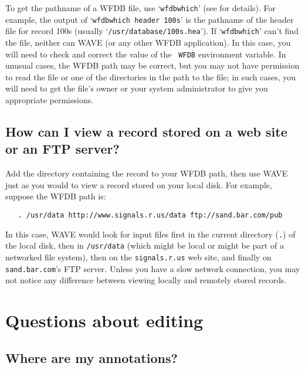\documentclass[twoside]{book}
\newcommand{\WAVE}{{\sf WAVE}\xspace}
\begin{document}
To get the pathname of a WFDB file, use `{\tt wfdbwhich}' (see
for details).  For example, the output of `{\tt wfdbwhich
header 100s}' is the pathname of the header file for record 100s
(usually `{\tt /usr/database/100s.hea}').  If `{\tt wfdbwhich}'
can't find the file, neither can \WAVE{} (or any other WFDB application).
In this case, you will need to check and correct the value of the {\tt
WFDB} environment variable.  In unusual cases, the WFDB path may be
correct, but you may not have permission to read the file or one of
the directories in the path to the file; in such cases, you will need
to get the file's owner or your system administrator to give you
appropriate permissions.

\subsection{How can I view a record stored on a web site or an FTP server?}

Add the directory containing the record to your WFDB path, then use \WAVE{}
just as you would to view a record stored on your local disk.  For example,
suppose the WFDB path is:
\begin{verbatim}
   . /usr/data http://www.signals.r.us/data ftp://sand.bar.com/pub
\end{verbatim}
In this case, \WAVE{} would look for input files first in the current directory
({\tt .}) of the local disk, then in {\tt /usr/data} (which might be
local or might be part of a networked file system), then on the
{\tt signals.r.us} web site, and finally on {\tt sand.bar.com}'s FTP server.
Unless you have a slow network connection, you may not notice any difference
between viewing locally and remotely stored records.

\section{Questions about editing}

\subsection{Where are my annotations?}

\end{document}

